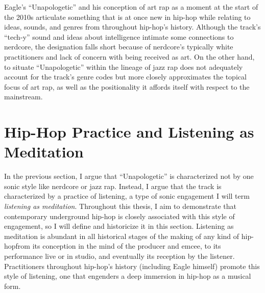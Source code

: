 Eagle's ``Unapologetic'' and his conception of art rap as a moment at the start of the 2010s articulate something
that is at once new in hip-hop while relating to ideas, sounds, and genres from throughout hip-hop's history. 
Although the track's ``tech-y'' sound and ideas about intelligence intimate some connections to nerdcore, the
designation falls short because of nerdcore's typically white practitioners and lack of concern with being 
received as art. On the other hand, to situate ``Unapologetic'' within the lineage of jazz rap does not adequately
account for the track's genre codes but more closely approximates the topical focus of art rap, as well as the 
positionality it affords itself with respect to the mainstream.

\section{Hip-Hop Practice and Listening as Meditation} \label{listeningasmeditation}

In the previous section, I argue that ``Unapologetic'' is characterized not by one sonic style like
nerdcore or jazz rap. Instead, I argue that the track is characterized by a practice of listening,
a type of sonic engagement I will term \emph{listening as meditation}. Throughout this thesis, I aim
to demonstrate that contemporary underground hip-hop is closely associated with this style of engagement,
so I will define and historicize it in this section. Listening as meditation is abundant in all historical 
stages of the making of any kind of hip-hop\textemdash from its conception in the mind of the producer
and emcee, to its performance live or in studio, and eventually its reception by the listener. 
Practitioners throughout hip-hop's history (including Eagle himself) promote this style of listening,
one that engenders a deep immersion in hip-hop as a musical form.

